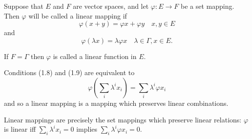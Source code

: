 Suppose that $E$ and $F$ are vector spaces, and let $\varphi: E \rightarrow F$ be a set mapping. Then $\varphi$ will be called a linear mapping if
$$\varphi(x + y) = \varphi x + \varphi y \quad x, y \in E$$
and
$$\varphi(\lambda x) = \lambda \varphi x \quad \lambda \in \Gamma, x \in E.$$

If $F = \Gamma$ then $\varphi$ is called a linear function in $E$.

Conditions (1.8) and (1.9) are equivalent to
$$\varphi \left( \sum_i \lambda^i x_i \right) = \sum_i \lambda^i \varphi x_i$$
and so a linear mapping is a mapping which preserves linear combinations.

Linear mappings are precisely the set mappings which preserve linear relations: $\varphi$ is linear iff $\sum_i \lambda^i x_i = 0$ implies $\sum_i \lambda^i \varphi x_i = 0$.
